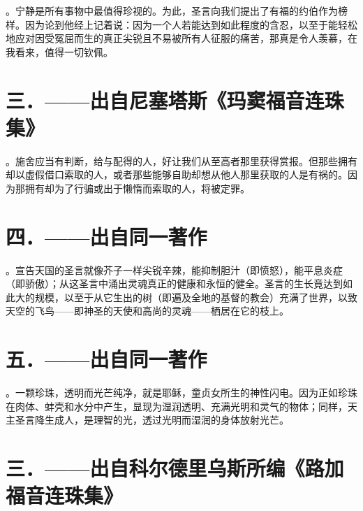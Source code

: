 。宁静是所有事物中最值得珍视的。为此，圣言向我们提出了有福的约伯作为榜样。因为论到他经上记着说：因为一个人若能达到如此程度的含忍，以至于能轻松地应对因受冤屈而生的真正尖锐且不易被所有人征服的痛苦，那真是令人羡慕，在我看来，值得一切钦佩。\par


\section{三．——出自尼塞塔斯《玛窦福音连珠集》}

。施舍应当有判断，给与配得的人，好让我们从至高者那里获得赏报。但那些拥有却以虚假借口索取的人，或者那些能够自助却想从他人那里获取的人是有祸的。因为那拥有却为了行骗或出于懒惰而索取的人，将被定罪。\par


\section{四．——出自同一著作}

。宣告天国的圣言就像芥子一样尖锐辛辣，能抑制胆汁（即愤怒），能平息炎症（即骄傲）；从这圣言中涌出灵魂真正的健康和永恒的健全。圣言的生长竟达到如此大的规模，以至于从它生出的树（即遍及全地的基督的教会）充满了世界，以致天空的飞鸟——即神圣的天使和高尚的灵魂——栖居在它的枝上。\par


\section{五．——出自同一著作}

。一颗珍珠，透明而光芒纯净，就是耶稣，童贞女所生的神性闪电。因为正如珍珠在肉体、蚌壳和水分中产生，显现为湿润透明、充满光明和灵气的物体；同样，天主圣言降生成人，是理智的光，透过光明而湿润的身体放射光芒。\par


\section{三．——出自科尔德里乌斯所编《路加福音连珠集》}

